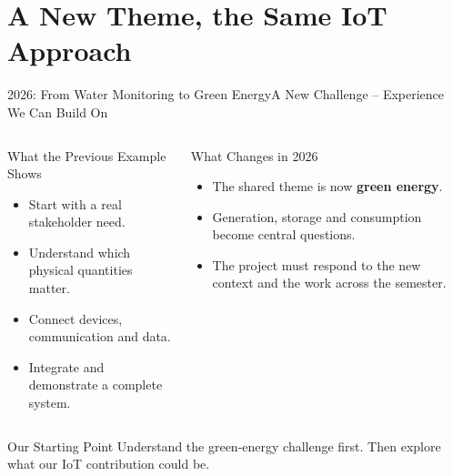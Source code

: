 \part[nopartpage]{A New Theme, the Same IoT Approach}

\begin{frame}{2026: From Water Monitoring to Green Energy}{A New Challenge -- Experience We Can Build On}
\begin{columns}[T,onlytextwidth]
\begin{block}{What the Previous Example Shows}
\begin{itemize}
\item Start with a real stakeholder need.
\item Understand which physical quantities matter.
\item Connect devices, communication and data.
\item Integrate and demonstrate a complete system.
\end{itemize}
\end{block}
\begin{block}{What Changes in 2026}
\begin{itemize}
\item The shared theme is now \textbf{green energy}.
\item Generation, storage and consumption become central questions.
\item The project must respond to the new context and the work across the semester.
\end{itemize}
\end{block}
\end{columns}
\begin{alertblock}{Our Starting Point}
Understand the green-energy challenge first. Then explore what our IoT contribution could be.
\end{alertblock}
\end{frame}
